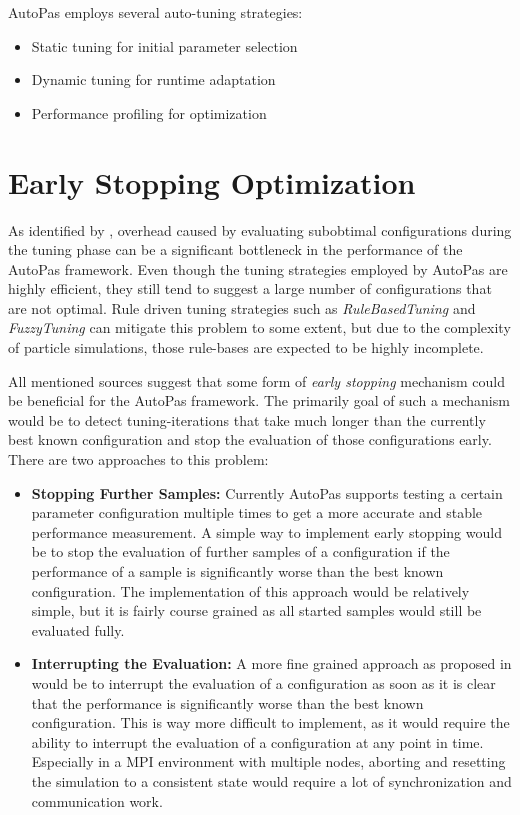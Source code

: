 \documentclass[conference]{IEEEtran}
\begin{document}
AutoPas employs several auto-tuning strategies:

\begin{itemize}
    \item Static tuning for initial parameter selection
    \item Dynamic tuning for runtime adaptation
    \item Performance profiling for optimization
\end{itemize}

\newpage
\newpage

\section{Early Stopping Optimization}

As identified by \cite{autopas_issue673}\cite{endreport.pdf}\cite{Manuel_Lerchner_Thesis.pdf}, overhead caused by evaluating subobtimal configurations during the tuning phase can be a significant bottleneck in the performance of the AutoPas framework. Even though the tuning strategies employed by AutoPas are highly efficient, they still tend to suggest a large number of configurations that are not optimal. Rule driven tuning strategies such as \textit{RuleBasedTuning} and \textit{FuzzyTuning} can mitigate this problem to some extent, but due to the complexity of particle simulations, those rule-bases are expected to be highly incomplete.

All mentioned sources suggest that some form of \textit{early stopping} mechanism could be beneficial for the AutoPas framework. The primarily goal of such a mechanism would be to detect tuning-iterations that take much longer than the currently best known configuration and stop the evaluation of those configurations early. There are two approaches to this problem:

\begin{itemize}
    \item \textbf{Stopping Further Samples:} Currently AutoPas supports testing a certain parameter configuration multiple times to get a more accurate and stable performance measurement. A simple way to implement early stopping would be to stop the evaluation of further samples of a configuration if the performance of a sample is significantly worse than the best known configuration. The implementation of this approach would be relatively simple, but it is fairly course grained as all started samples would still be evaluated fully.
    \item \textbf{Interrupting the Evaluation:} A more fine grained approach as proposed in \cite{endreport.pdf} would be to interrupt the evaluation of a configuration as soon as it is clear that the performance is significantly worse than the best known configuration. This is way more difficult to implement, as it would require the ability to interrupt the evaluation of a configuration at any point in time. Especially in a MPI environment with multiple nodes, aborting and resetting the simulation to a consistent state would require a lot of synchronization and communication work.
\end{itemize}
\end{document}
